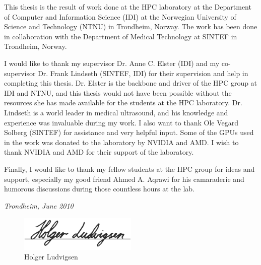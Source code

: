 This thesis is the result of work done at the HPC laboratory at the Department of Computer and Information Science (IDI) at the Norwegian University of Science and Technology (NTNU) in Trondheim, Norway. The work has been done in collaboration with the Department of Medical Technology at SINTEF in Trondheim, Norway.

I would like to thank my supervisor Dr. Anne C. Elster (IDI) and my co-supervisor Dr. Frank Lindseth (SINTEF, IDI) for their supervision and help in completing this thesis. Dr. Elster is the backbone and driver of the HPC group at IDI and NTNU, and this thesis would not have been possible without the resources she has made available for the students at the HPC laboratory. Dr. Lindseth is a world leader in medical ultrasound, and his knowledge and experience was invaluable during my work. I also want to thank Ole Vegard Solberg (SINTEF) for assistance and very helpful input. Some of the GPUs used in the work was donated to the laboratory by NVIDIA and AMD. I wish to thank NVIDIA and AMD for their support of the laboratory.

Finally, I would like to thank my fellow students at the HPC group for ideas and support, especially my good friend Ahmed A. Aqrawi for his camaraderie and humorous discussions during those countless hours at the lab.

\bigskip
\bigskip
\begin{center}
\emph{Trondheim, June 2010}
\end{center}
\begin{figure}[h]
\centering
\includegraphics[width=0.5\textwidth]{graphics/signature.png}
\caption*{Holger Ludvigsen}
\end{figure}